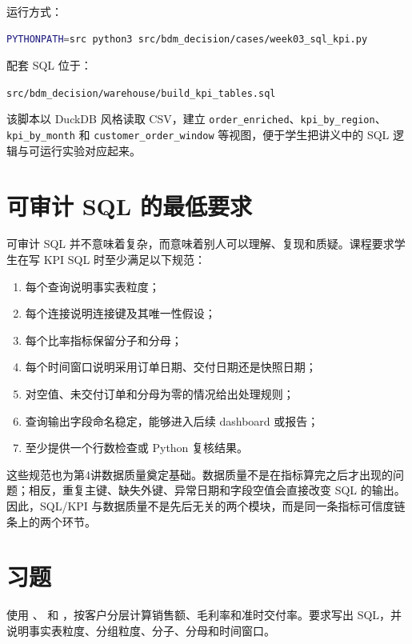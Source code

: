 \documentclass[UTF8,fontset=fandol,openany,zihao=-4]{ctexbook}
\begin{document}
运行方式：
\begin{lstlisting}[language=bash,caption={运行第三周案例代码}]
PYTHONPATH=src python3 src/bdm_decision/cases/week03_sql_kpi.py
\end{lstlisting}

配套 SQL 位于：
\begin{center}
\texttt{src/bdm\_decision/warehouse/build\_kpi\_tables.sql}
\end{center}

该脚本以 DuckDB 风格读取 CSV，建立 \texttt{order\_enriched}、\texttt{kpi\_by\_region}、\texttt{kpi\_by\_month} 和 \texttt{customer\_order\_window} 等视图，便于学生把讲义中的 SQL 逻辑与可运行实验对应起来。

\section{可审计 SQL 的最低要求}

可审计 SQL 并不意味着复杂，而意味着别人可以理解、复现和质疑。课程要求学生在写 KPI SQL 时至少满足以下规范：
\begin{enumerate}
  \item 每个查询说明事实表粒度；
  \item 每个连接说明连接键及其唯一性假设；
  \item 每个比率指标保留分子和分母；
  \item 每个时间窗口说明采用订单日期、交付日期还是快照日期；
  \item 对空值、未交付订单和分母为零的情况给出处理规则；
  \item 查询输出字段命名稳定，能够进入后续 dashboard 或报告；
  \item 至少提供一个行数检查或 Python 复核结果。
\end{enumerate}

这些规范也为第4讲数据质量奠定基础。数据质量不是在指标算完之后才出现的问题；相反，重复主键、缺失外键、异常日期和字段空值会直接改变 SQL 的输出。因此，SQL/KPI 与数据质量不是先后无关的两个模块，而是同一条指标可信度链条上的两个环节。

\section*{习题}

\begin{exercise}
使用 、 和 ，按客户分层计算销售额、毛利率和准时交付率。要求写出 SQL，并说明事实表粒度、分组粒度、分子、分母和时间窗口。
\end{exercise}
\end{document}
